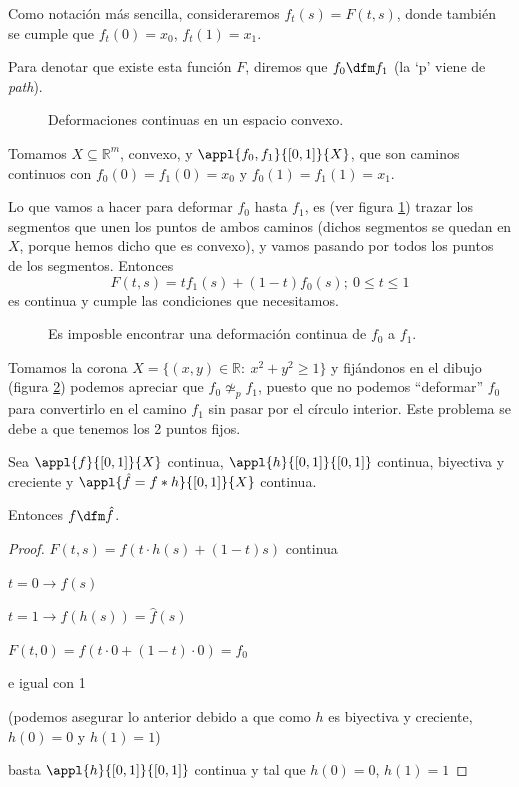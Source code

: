 \documentclass{apuntes}
\begin{document}
Como notación más sencilla, consideraremos $f_t(s) = F(t,s)$, donde también se cumple que $f_t(0)=x_0$, $f_t(1)=x_1$.

Para denotar que existe esta función $F$, diremos que $f_0 \dfm f_1$ (la `p' viene de \textit{path}).

\begin{example}
\begin{figure}[hbtp]
\caption{Deformaciones continuas en un espacio convexo.}
\label{figDefmConvexo}
\end{figure}

Tomamos $X⊆ℝ^m$, convexo, y $\appl{f_0,f_1}{[0,1]}{X}$, que son caminos continuos con $f_0(0)=f_1(0)=x_0$ y $f_0(1)=f_1(1) = x_1$.

Lo que vamos a hacer para deformar $f_0$ hasta $f_1$, es (ver figura \ref{figDefmConvexo}) trazar los segmentos que unen los puntos de ambos caminos (dichos segmentos se quedan en $X$, porque hemos dicho que es convexo), y vamos pasando por todos los puntos de los segmentos. Entonces \[F(t,s) = tf_1(s) + (1-t)f_0(s); \ 0≤t≤1 \] es continua y cumple las condiciones que necesitamos.

\end{example}


\begin{example}

\begin{figure}[hbtp]
\caption{Es imposble encontrar una deformación continua de $f_0$ a $f_1$.}
\label{figDefmImposible}
\end{figure}

Tomamos la corona $X = \{(x,y) ∈ ℝ : \ x^2+y^2≥1\}$ y fijándonos en el dibujo (figura \ref{figDefmImposible}) podemos apreciar que $f_0 \not\simeq_p f_1$, puesto que no podemos ``deformar'' $f_0$ para convertirlo en el camino $f_1$ sin pasar por el círculo interior. Este problema se debe a que tenemos los 2 puntos fijos.
\end{example}


\begin{lemma} Sea $\appl{f}{[0,1]}{X}$ continua, $\appl{h}{[0,1]}{[0,1]}$ continua, biyectiva y creciente y $\appl{\hat{f} = f \ast h}{[0,1]}{X}$ continua.

Entonces $f \dfm \hat{f}$.
\end{lemma}

\begin{proof}

$F(t,s) = f(t·h(s) + (1-t) s)$ continua

$t = 0 \to f(s)$

$t = 1 \to f(h(s)) = \hat{f}(s)$

$F(t,0) = f(t·0 + (1-t)·0) = f_0$

e igual con 1

(podemos asegurar lo anterior debido a que como $h$ es biyectiva y creciente, $h(0) = 0$ y $h(1) = 1$)

\obs basta $\appl{h}{[0,1]}{[0,1]}$ continua y tal que $h(0)=0$, $h(1)=1$
\end{proof}
\end{document}
